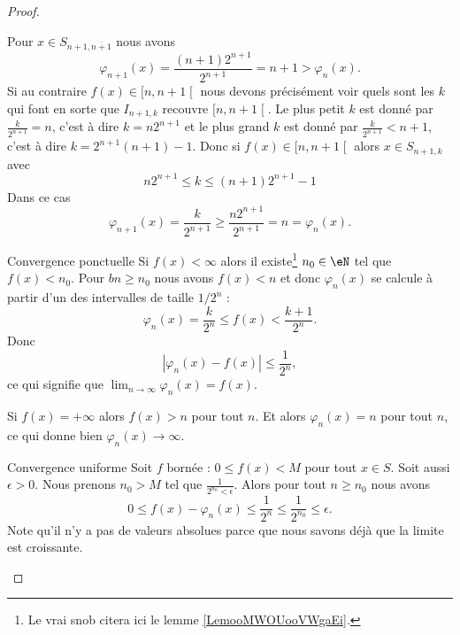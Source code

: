 \begin{proof}
\begin{subproof}
        Pour \( x\in S_{n+1,\overline{ n+1 }}\) nous avons
        \begin{equation}
            \varphi_{n+1}(x)=\frac{ (n+1)2^{n+1} }{ 2^{n+1} }=n+1>\varphi_n(x).
        \end{equation}
        Si au contraire \( f(x)\in\mathopen[ n , n+1 \mathclose[ \) nous devons précisément voir quels sont les \( k\) qui font en sorte que \( I_{n+1,k}\) recouvre \( \mathopen[ n , n+1 \mathclose[\). Le plus petit \( k\) est donné par \( \frac{ k }{ 2^{n+1} }=n\), c'est à dire \( k=n2^{n+1}\) et le plus grand \( k\) est donné par \( \frac{ k }{ 2^{n+1} }<n+1\), c'est à dire \( k=2^{n+1}(n+1)-1\). Donc si \( f(x)\in\mathopen[ n , n+1 \mathclose[\) alors \( x\in S_{n+1,k}\) avec
            \begin{equation}
                n2^{n+1}\leq k\leq (n+1)2^{n+1}-1
            \end{equation}
            Dans ce cas 
            \begin{equation}
                \varphi_{n+1}(x)=\frac{ k }{ 2^{n+1} }\geq \frac{ n2^{n+1} }{ 2^{n+1} }=n=\varphi_n(x).
            \end{equation}
    \item[Convergence ponctuelle]
        Si \( f(x)<\infty\) alors il existe\footnote{Le vrai snob citera ici le lemme \ref{LemooMWOUooVWgaEi}.} \( n_0\in\eN\) tel que \( f(x)<n_0\). Pour \( bn\geq n_0\) nous avons \( f(x)<n\) et donc \( \varphi_n(x)\) se calcule à partir d'un des intervalles de taille \( 1/2^n\) :
        \begin{equation}
            \varphi_n(x)=\frac{ k }{ 2^n }\leq f(x)<\frac{ k+1 }{ 2^n }.
        \end{equation}
        Donc 
        \begin{equation}
            | \varphi_n(x)-f(x) |\leq \frac{1}{ 2^n },
        \end{equation}
        ce qui signifie que \( \lim_{n\to \infty} \varphi_n(x)=f(x)\).

        Si \( f(x)=+\infty\) alors \( f(x)>n\) pour tout \( n\). Et alors \( \varphi_n(x)=n\) pour tout \( n\), ce qui donne bien \( \varphi_n(x)\to \infty\).
    \item[Convergence uniforme]
        Soit \( f\) bornée : \( 0\leq f(x)<M\) pour tout \( x\in S\). Soit aussi \( \epsilon>0\). Nous prenons \( n_0>M\) tel que \( \frac{1}{ 2^{n_0}<\epsilon }\). Alors pour tout \( n\geq n_0\) nous avons
        \begin{equation}
            0\leq f(x)-\varphi_n(x)\leq \frac{1}{ 2^n }\leq \frac{1}{ 2^{n_0} }\leq \epsilon.
        \end{equation}
        Note qu'il n'y a pas de valeurs absolues parce que nous savons déjà que la limite est croissante.
    \end{subproof}
\end{proof}

